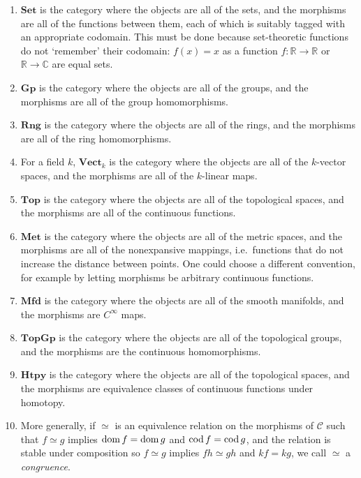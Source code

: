 \begin{example}
    \begin{enumerate}
        \item \( \mathbf{Set} \) is the category where the objects are all of the sets, and the morphisms are all of the functions between them, each of which is suitably tagged with an appropriate codomain.
        This must be done because set-theoretic functions do not `remember' their codomain: \( f(x) = x \) as a function \( f : \mathbb R \to \mathbb R \) or \( \mathbb R \to \mathbb C \) are equal sets.
        \item \( \mathbf{Gp} \) is the category where the objects are all of the groups, and the morphisms are all of the group homomorphisms.
        \item \( \mathbf{Rng} \) is the category where the objects are all of the rings, and the morphisms are all of the ring homomorphisms.
        \item For a field \( k \), \( \mathbf{Vect}_k \) is the category where the objects are all of the \( k \)-vector spaces, and the morphisms are all of the \( k \)-linear maps.
        \item \( \mathbf{Top} \) is the category where the objects are all of the topological spaces, and the morphisms are all of the continuous functions.
        \item \( \mathbf{Met} \) is the category where the objects are all of the metric spaces, and the morphisms are all of the nonexpansive mappings, i.e.\ functions that do not increase the distance between points.
        One could choose a different convention, for example by letting morphisms be arbitrary continuous functions.
        \item \( \mathbf{Mfd} \) is the category where the objects are all of the smooth manifolds, and the morphisms are \( C^\infty \) maps.
        \item \( \mathbf{TopGp} \) is the category where the objects are all of the topological groups, and the morphisms are the continuous homomorphisms.
        \item \( \mathbf{Htpy} \) is the category where the objects are all of the topological spaces, and the morphisms are equivalence classes of continuous functions under homotopy.
        \item More generally, if \( \simeq \) is an equivalence relation on the morphisms of \( \mathcal C \) such that \( f \simeq g \) implies \( \operatorname{dom} f = \operatorname{dom} g \) and \( \operatorname{cod} f = \operatorname{cod} g \), and the relation is stable under composition so \( f \simeq g \) implies \( fh \simeq gh \) and \( kf = kg \), we call \( \simeq \) a \emph{congruence}.

\end{enumerate}
\end{example}
